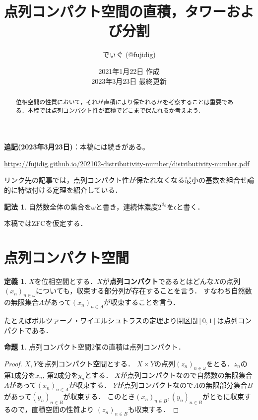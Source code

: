 \documentclass[uplatex,dvipdfmx]{jsarticle}
\title{点列コンパクト空間の直積，タワーおよび分割}
\author{でぃぐ (@fujidig)}
\date{2021年1月22日 作成 \\ 2023年3月23日 最終更新}
\theoremstyle{definition}
\newtheorem*{defi*}{定義}
\newtheorem{prop}[thm]{命題}
\newtheorem*{notation*}{記法}
\theoremstyle{named}
\begin{document}
\maketitle

\begin{abstract}
位相空間の性質において，それが直積により保たれるかを考察することは重要である．本稿では点列コンパクト性が直積でどこまで保たれるか考えよう．
\end{abstract}
\tableofcontents


\vspace{0.5cm}

\begin{mdframed}[backgroundcolor=reasonbg,linewidth=0]
	\color{reasontext}
	\textbf{追記(2023年3月23日)}：本稿には続きがある。
	
	\url{https://fujidig.github.io/202102-distributivity-number/distributivity-number.pdf}
	
	リンク先の記事では，点列コンパクト性が保たれなくなる最小の基数を組合せ論的に特徴付ける定理を紹介している．
\end{mdframed}

\begin{notation*}
自然数全体の集合を$\omega$と書き，連続体濃度$2^{\aleph_0}$を$\mathfrak{c}$と書く．
\end{notation*}

本稿ではZFCを仮定する．

\section{点列コンパクト空間}

\begin{defi*}
$X$を位相空間とする．$X$が{\bfseries 点列コンパクト}であるとはどんな$X$の点列$(x_n)_{n \in \omega}$についても，収束する部分列が存在することを言う．
すなわち自然数の無限集合$A$があって$(x_n)_{n \in A}$が収束することを言う．
\end{defi*}

たとえばボルツァーノ・ワイエルシュトラスの定理より閉区間$[0, 1]$は点列コンパクトである．

\begin{prop}
点列コンパクト空間$2$個の直積は点列コンパクト．
\end{prop}
\begin{proof}
$X, Y$を点列コンパクト空間とする．
$X \times Y$の点列$(z_n)_{n \in \omega}$をとる．$z_n$の第$1$成分を$x_n$, 第$2$成分を$y_n$とする．
$X$が点列コンパクトなので自然数の無限集合$A$があって$(x_n)_{n \in A}$が収束する．
$Y$が点列コンパクトなので$A$の無限部分集合$B$があって$(y_n)_{n \in B}$が収束する．
このとき$(x_n)_{n \in B}, (y_n)_{n \in B}$がともに収束するので，直積空間の性質より
$(z_n)_{n \in B}$も収束する．
\end{proof}
\end{document}
